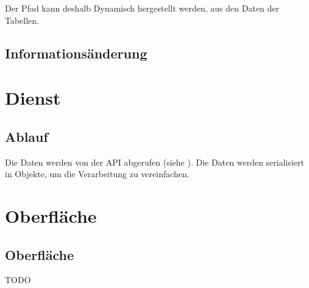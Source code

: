 \documentclass{article}
\begin{document}
Der Pfad kann deshalb Dynamisch hergestellt werden, aus den Daten der Tabellen.

\subsection{Informationsänderung}

\newpage

\section{Dienst}

\subsection{Ablauf}

Die Daten werden von der API abgerufen (siehe \textit{}). Die Daten werden serialisiert in Objekte, um die Verarbeitung zu vereinfachen. 

\newpage

\section{Oberfläche}

\subsection{Oberfläche}

TODO
\end{document}
